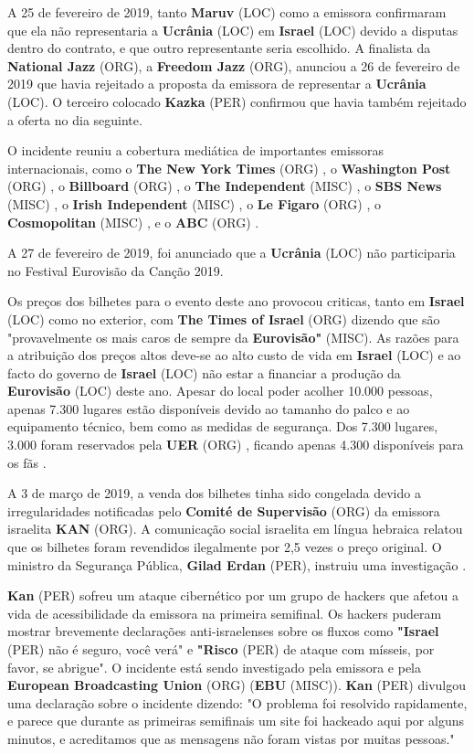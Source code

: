 \documentclass[12pt,a4paper]{article}
\begin{document}
A 25 de fevereiro de 2019, tanto \textbf{Maruv} (LOC) como a emissora confirmaram que ela não representaria a \textbf{Ucrânia} (LOC) em \textbf{Israel} (LOC) devido a disputas dentro do contrato, e que outro representante seria escolhido. A finalista da \textbf{National Jazz} (ORG), a \textbf{Freedom Jazz} (ORG), anunciou a 26 de fevereiro de 2019 que havia rejeitado a proposta da emissora de representar a \textbf{Ucrânia} (LOC). O terceiro colocado \textbf{Kazka} (PER) confirmou que havia também rejeitado a oferta no dia seguinte.

O incidente reuniu a cobertura mediática de importantes emissoras internacionais, como o \textbf{The New York Times} (ORG) , o \textbf{Washington Post} (ORG) , o \textbf{Billboard} (ORG) , o \textbf{The Independent} (MISC) , o \textbf{SBS News} (MISC) , o \textbf{Irish Independent} (MISC) , o \textbf{Le Figaro} (ORG) , o \textbf{Cosmopolitan} (MISC) , e o \textbf{ABC} (ORG) .

A 27 de fevereiro de 2019, foi anunciado que a \textbf{Ucrânia} (LOC) não participaria no Festival Eurovisão da Canção 2019.

Os preços dos bilhetes para o evento deste ano provocou criticas, tanto em \textbf{Israel} (LOC) como no exterior, com \textbf{The Times of Israel} (ORG) dizendo que são "provavelmente os mais caros de sempre da \textbf{Eurovisão"} (MISC). As razões para a atribuição dos preços altos deve-se ao alto custo de vida em \textbf{Israel} (LOC) e ao facto do governo de \textbf{Israel} (LOC) não estar a financiar a produção da \textbf{Eurovisão} (LOC) deste ano. Apesar do local poder acolher 10.000 pessoas, apenas 7.300 lugares estão disponíveis devido ao tamanho do palco e ao equipamento técnico, bem como as medidas de segurança. Dos 7.300 lugares, 3.000 foram reservados pela \textbf{UER} (ORG) , ficando apenas 4.300 disponíveis para os fãs .

A 3 de março de 2019, a venda dos bilhetes tinha sido congelada devido a irregularidades notificadas pelo \textbf{Comité de Supervisão} (ORG) da emissora israelita \textbf{KAN} (ORG). A comunicação social israelita em língua hebraica relatou que os bilhetes foram revendidos ilegalmente por 2,5 vezes o preço original. O ministro da Segurança Pública, \textbf{Gilad Erdan} (PER), instruiu uma investigação .

\textbf{Kan} (PER) sofreu um ataque cibernético por um grupo de hackers que afetou a vida de acessibilidade da emissora na primeira semifinal. Os hackers puderam mostrar brevemente declarações anti-israelenses sobre os fluxos como \textbf{"Israel} (PER) não é seguro, você verá" e \textbf{"Risco} (PER) de ataque com mísseis, por favor, se abrigue". O incidente está sendo investigado pela emissora e pela \textbf{European Broadcasting Union} (ORG) (\textbf{EBU} (MISC)). \textbf{Kan} (PER) divulgou uma declaração sobre o incidente dizendo: "O problema foi resolvido rapidamente, e parece que durante as primeiras semifinais um site foi hackeado aqui por alguns minutos, e acreditamos que as mensagens não foram vistas por muitas pessoas."
\end{document}
